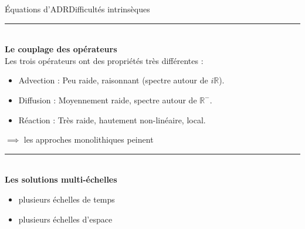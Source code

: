 \begin{frame}{Équations d'ADR}{Difficultés intrinsèques}

    \noindent\color{Primary}\rule{\linewidth}{0.6pt}\color{black}\\
    \textbf{Le couplage des opérateurs}\\[0.5em]
    Les trois opérateurs ont des propriétés très différentes :
    \begin{itemize}
        \item Advection : Peu raide, raisonnant (spectre autour de $i\mathbb R$).
        \item Diffusion : Moyennement raide, spectre autour de $\mathbb R^-$.
        \item Réaction :  Très raide, hautement non-linéaire, local.
    \end{itemize}
    $\implies$ les approches monolithiques peinent\\
    \pause
\noindent\color{Primary}\rule{\linewidth}{0.6pt}\color{black}\\
    \textbf{Les solutions multi-échelles}\\[0.5em]
    \begin{itemize}
        \item plusieurs échelles de temps
        \item plusieurs échelles d'espace
    \end{itemize}


\end{frame}
